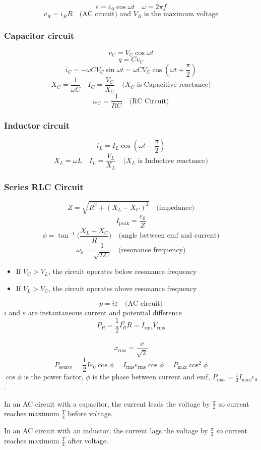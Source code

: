 \documentclass[8pt,twocolumn]{extarticle}
\begin{document}
\[\varepsilon=\varepsilon_0 \cos\omega t\quad \omega=2\pi f\]
\[v_R = i_R R\quad\text{(AC circuit) and $V_R$ is the maximum voltage}\]
\subsubsection*{Capacitor circuit}
\[v_C = V_C\cos\omega t\]
\[q=Cv_C\]
\[i_C=-\omega CV_C\sin\omega t=\omega CV_C\cos(\omega t + \frac{\pi}{2})\]
\[X_C=\frac{1}{\omega C}\quad I_C=\frac{V_C}{X_C}\quad\text{($X_C$ is Capacitive reactance)}\]
\[\omega_C = \frac{1}{RC}\quad\text{(RC Circuit)}\]
\subsubsection*{Inductor circuit}
\[i_L = I_L\cos(\omega t - \frac{\pi}{2})\]
\[X_L=\omega L\quad I_L=\frac{V_L}{X_L}\quad\text{($X_L$ is Inductive reactance)}\]
\subsubsection*{Series RLC Circuit}
\[Z=\sqrt{R^2 + {(X_L - X_C)}^2}\quad\text{(impedance)}\]
\[I_\text{peak}=\frac{\varepsilon_0}{Z}\]
\[\phi = \tan^{-1}\Big(\frac{X_L - X_C}{R}\Big)\quad\text{(angle between emf and current)}\]
\[\omega_0 = \frac{1}{\sqrt{LC}}\quad\text{(resonance frequency)}\]
\begin{itemize}
    \item If $V_C > V_L$, the circuit operates below resonance frequency
    \item If $V_L > V_C$, the circuit operates above resonance frequency
\end{itemize}

\[p=i\varepsilon\quad\text{(AC circuit)}\]
$i$ and $\varepsilon$ are instantaneous current and potential difference
\[P_R = \frac{1}{2}I_R^2 R=I_\text{rms}V_\text{rms}\]\
\[x_\text{rms}=\frac{x}{\sqrt{2}}\]
\[P_\text{source}=\frac{1}{2}I\varepsilon_0\cos\phi = I_\text{rms}\varepsilon_\text{rms}\cos\phi=
P_\text{max}\cos^2\phi\]
$\cos\phi$ is the power factor, $\phi$ is the phase between current and emf, $P_\text{mas}=
\frac{1}{2}I_\text{max}\varepsilon_0$.

In an AC circuit with a capacitor, the current leads the voltage by $\frac{\pi}{2}$ so current
reaches maximum $\frac{T}{4}$ before voltage.

In an AC circuit with an inductor, the current lags the voltage by $\frac{\pi}{2}$ so current
reaches maximum $\frac{T}{4}$ after voltage.
\end{document}
